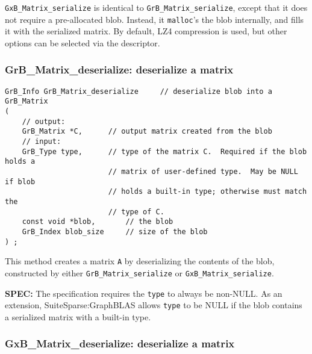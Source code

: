 \documentclass[12pt]{article}
\begin{document}
{\verb'GxB_Matrix_serialize' is identical to \verb'GrB_Matrix_serialize', except
that it does not require a pre-allocated blob.  Instead, it \verb'malloc''s the
blob internally, and fills it with the serialized matrix.
By default, LZ4 compression is used, but other options can be selected
via the descriptor.

\newpage
\subsubsection{{\sf GrB\_Matrix\_deserialize:}    deserialize a matrix}
\label{matrix_deserialize}

\begin{mdframed}[userdefinedwidth=6in]
{\footnotesize
\begin{verbatim}
GrB_Info GrB_Matrix_deserialize     // deserialize blob into a GrB_Matrix
(
    // output:
    GrB_Matrix *C,      // output matrix created from the blob
    // input:
    GrB_Type type,      // type of the matrix C.  Required if the blob holds a
                        // matrix of user-defined type.  May be NULL if blob
                        // holds a built-in type; otherwise must match the
                        // type of C.
    const void *blob,       // the blob
    GrB_Index blob_size     // size of the blob
) ;
\end{verbatim}
} \end{mdframed}

This method creates a matrix \verb'A' by deserializing the contents of the
blob, constructed by either \verb'GrB_Matrix_serialize' or
\verb'GxB_Matrix_serialize'.

\begin{alert}
{\bf SPEC:} The specification requires the \verb'type' to always be non-NULL.
As an extension, SuiteSparse:GraphBLAS allows \verb'type' to be NULL if
the blob contains a serialized matrix with a built-in type.
\end{alert}

\subsubsection{{\sf GxB\_Matrix\_deserialize:}    deserialize a matrix}
\label{matrix_deserialize_GxB}

}
\end{document}
